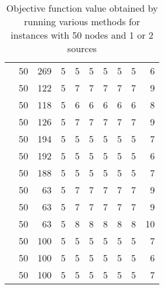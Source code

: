\begin{table}[]
\begin{tabular}{rrrrrrrrrr}
                    & 50  & 269   & 5  & 5       & 5       & 5       & 5       & 5       & 6     \\
                    & 50  & 122   & 5  & 7       & 7       & 7       & 7       & 7       & 9     \\
                    & 50  & 118   & 5  & 6       & 6       & 6       & 6       & 6       & 8     \\
                    & 50  & 126   & 5  & 7       & 7       & 7       & 7       & 7       & 9     \\
                    & 50  & 194   & 5  & 5       & 5       & 5       & 5       & 5       & 7     \\
                    & 50  & 192   & 5  & 5       & 5       & 5       & 5       & 5       & 6     \\
                    & 50  & 188   & 5  & 5       & 5       & 5       & 5       & 5       & 7     \\
                    & 50  & 63    & 5  & 7       & 7       & 7       & 7       & 7       & 9     \\
                    & 50  & 63    & 5  & 7       & 7       & 7       & 7       & 7       & 9     \\
                    & 50  & 63    & 5  & 8       & 8       & 8       & 8       & 8       & 10    \\
                    & 50  & 100   & 5  & 5       & 5       & 5       & 5       & 5       & 7     \\
                    & 50  & 100   & 5  & 5       & 5       & 5       & 5       & 5       & 6     \\
                    & 50  & 100   & 5  & 5       & 5       & 5       & 5       & 5       & 7    
\end{tabular}
\caption{Objective function value obtained by running various methods for instances with 50 nodes and 1 or 2 sources}
\label{tab:obj:50}
\end{table}

